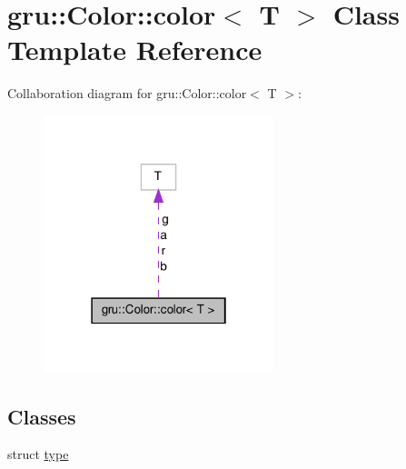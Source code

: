 \hypertarget{classgru_1_1Color_1_1color}{\section{gru\-:\-:\-Color\-:\-:color$<$ \-T $>$ \-Class \-Template \-Reference}
\label{classgru_1_1Color_1_1color}
}


\-Collaboration diagram for gru\-:\-:\-Color\-:\-:color$<$ \-T $>$\-:\nopagebreak
\begin{figure}[H]
\begin{center}
\leavevmode
\includegraphics[width=190pt]{classgru_1_1Color_1_1color__coll__graph}
\end{center}
\end{figure}
\subsection*{\-Classes}
\begin{DoxyCompactItemize}
\item 
struct \hyperlink{structgru_1_1Color_1_1color_1_1type}{type}
\end{DoxyCompactItemize}
